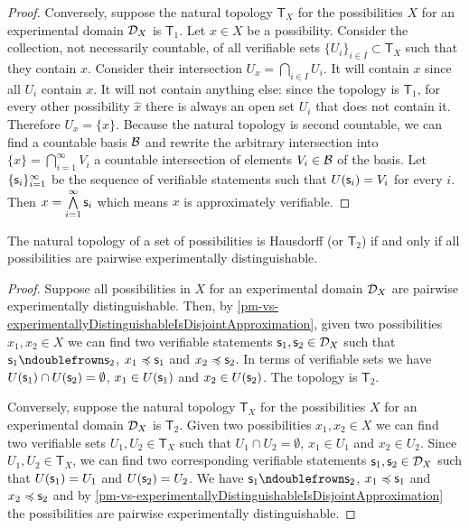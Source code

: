 \begin{mathSection}
\begin{proof}
			Conversely, suppose the natural topology $\mathsf{T}_X$ for the possibilities $X$ for an experimental domain $\mathcal{D}_X$ is $\mathsf{T}_1$. Let $x \in X$ be a possibility. Consider the collection, not necessarily countable, of all verifiable sets $\{U_i\}_{i \in I} \subset \mathsf{T}_X$ such that they contain $x$. Consider their intersection $U_x = \bigcap\limits_{i \in I} U_i$. It will contain $x$ since all $U_i$ contain $x$. It will not contain anything else: since the topology is $\mathsf{T}_1$, for every other possibility $\hat{x}$ there is always an open set $U_i$ that does not contain it. Therefore $U_x = \{x\}$. Because the natural topology is second countable, we can find a countable basis $\mathcal{B}$ and rewrite the arbitrary intersection into $\{x\} = \bigcap\limits_{i=1}^\infty V_i$ a countable intersection of elements $V_i \in \mathcal{B}$ of the basis. Let $\{\mathsf{s}_i\}_{i=1}^\infty$ be the sequence of verifiable statements such that $U(\mathsf{s}_i) = V_i$ for every $i$. Then $x=\bigwedge\limits_{i=1}^\infty \mathsf{s}_i$ which means $x$ is approximately verifiable.
			
		\end{proof}
		\begin{prop}
			The natural topology of a set of possibilities is Hausdorff (or $\mathsf{T}_2$) if and only if all possibilities are pairwise experimentally distinguishable.
		\end{prop}
		\begin{proof}
			Suppose all possibilities in $X$ for an experimental domain $\mathcal{D}_X$ are pairwise experimentally distinguishable. Then, by \ref{pm-vs-experimentallyDistinguishableIsDisjointApproximation}, given two possibilities $x_1, x_2 \in X$ we can find two verifiable statements $\mathsf{s}_1, \mathsf{s}_2 \in \mathcal{D}_X$ such that $\stmt_1 \ncomp \stmt_2$, $x_1 \preccurlyeq \mathsf{s}_1$ and $x_2 \preccurlyeq \mathsf{s}_2$. In terms of verifiable sets we have $U(\mathsf{s}_1) \cap U(\mathsf{s}_2) = \emptyset$, $x_1 \in U(\mathsf{s}_1)$ and $x_2 \in U(\mathsf{s}_2)$. The topology is $\mathsf{T}_2$.
			
			Conversely, suppose the natural topology $\mathsf{T}_X$ for the possibilities $X$ for an experimental domain $\mathcal{D}_X$ is $\mathsf{T}_2$. Given two possibilities $x_1, x_2 \in X$ we can find two verifiable sets $U_1, U_2 \in \mathsf{T}_X$ such that $U_1 \cap U_2 = \emptyset$, $x_1 \in U_1$ and $x_2 \in U_2$. Since $U_1, U_2 \in \mathsf{T}_X$, we can find two corresponding verifiable statements $\mathsf{s}_1, \mathsf{s}_2 \in \mathcal{D}_X$ such that $U(\mathsf{s}_1) = U_1$ and $U(\mathsf{s}_2) = U_2$. We have $\stmt_1 \ncomp \stmt_2$, $x_1 \preccurlyeq \mathsf{s}_1$ and $x_2 \preccurlyeq \mathsf{s}_2$ and by \ref{pm-vs-experimentallyDistinguishableIsDisjointApproximation} the possibilities are pairwise experimentally distinguishable.
		\end{proof}
	\end{mathSection}
	
